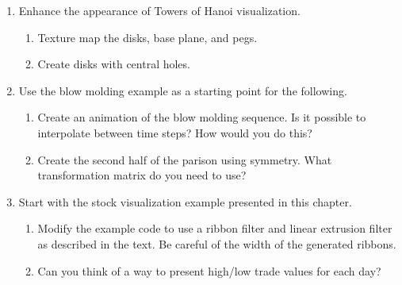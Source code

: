 \begin{enumerate}
	\item Enhance the appearance of Towers of Hanoi visualization.
	\begin{enumerate}
		\item Texture map the disks, base plane, and pegs.
		\item Create disks with central holes.
	\end{enumerate}

	\item Use the blow molding example as a starting point for the
	following.
	\begin{enumerate}
		\item Create an animation of the blow molding sequence. Is it possible to interpolate between time steps? How would you do this?
		\item Create the second half of the parison using symmetry. What   transformation matrix do you need to use?
	\end{enumerate}

	\item Start with the stock visualization example presented in this chapter.
	\begin{enumerate}
		\item Modify the example code to use a ribbon filter and linear extrusion filter as described in the text. Be careful of the width of the   generated ribbons.
		\item Can you think of a way to present high/low trade values for each day?
	\end{enumerate}

\end{enumerate}

